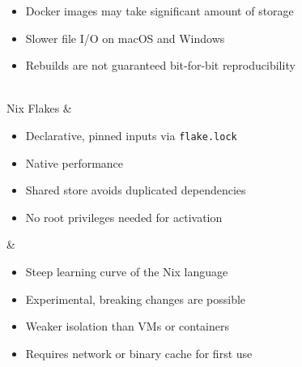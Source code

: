 \begin{table}[htbp]
\begin{tabularx}
\begin{itemize}
            \item Docker images may take significant amount of storage~\cite{valstarUsingDevContainersStandardize2020}

            \item Slower file I/O on macOS and Windows~\cite{valstarUsingDevContainersStandardize2020}

            \item Rebuilds are not guaranteed bit-for-bit reproducibility~\cite{duNixRescueReproducible2026a,NixBetterDocker2024}
        \end{itemize}
        \vspace{-0.5\baselineskip}
        \\ \midrule Nix Flakes &
        \vspace{-0.5\baselineskip}
        \begin{itemize}
            \item Declarative, pinned inputs via \texttt{flake.lock}~\cite{duNixRescueReproducible2026a,OSCodeMy2024}

            \item Native performance

            \item Shared store avoids duplicated dependencies~\cite{dolstraNixOSPurelyFunctional2010,NixFasterDocker}

            \item No root privileges needed for activation~\cite{duNixRescueReproducible2026a}
        \end{itemize}
        \vspace{-0.5\baselineskip}
        &
        \vspace{-0.5\baselineskip}
        \begin{itemize}
            \item Steep learning curve of the Nix language~\cite{duNixRescueReproducible2026a,OSCodeMy2024}

            \item Experimental, breaking changes are possible

            \item Weaker isolation than VMs or containers

            \item Requires network or binary cache for first use~\cite{malkaDoesFunctionalPackage2025}
        \end{itemize}
        \vspace{-0.5\baselineskip}
        \\ \bottomrule
    \end{tabularx}
\end{table}